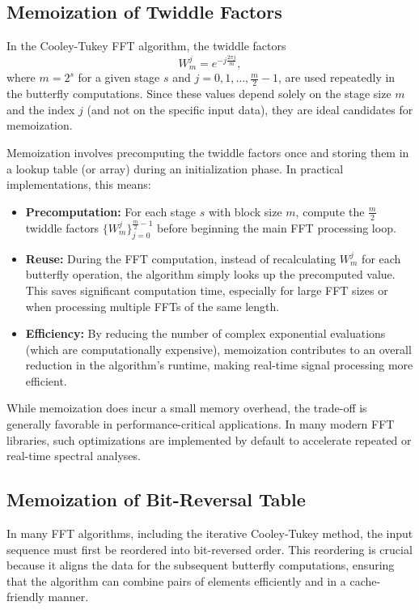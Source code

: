 \documentclass[12pt,letter]{article}
\begin{document}
\subsection{Memoization of Twiddle Factors}

In the Cooley-Tukey FFT algorithm, the twiddle factors
\[
W_m^j = e^{-j\frac{2\pi j}{m}},
\]
where $m = 2^s$ for a given stage $s$ and
$j = 0, 1, \ldots, \frac{m}{2}-1$, are used repeatedly in the butterfly
computations. Since these values depend solely on the stage size $m$ and
the index $j$ (and not on the specific input data), they are ideal
candidates for memoization.

Memoization involves precomputing the twiddle factors once and storing them
in a lookup table (or array) during an initialization phase. In practical
implementations, this means:
\begin{itemize}
  \item \textbf{Precomputation:} For each stage $s$ with block size
  $m$, compute the $\frac{m}{2}$ twiddle factors
  $\{W_m^j\}_{j=0}^{\frac{m}{2}-1}$ before beginning the main FFT
  processing loop.
  \item \textbf{Reuse:} During the FFT computation, instead of recalculating
  $W_m^j$ for each butterfly operation, the algorithm simply looks up the
  precomputed value. This saves significant computation time, especially for
  large FFT sizes or when processing multiple FFTs of the same length.
  \item \textbf{Efficiency:} By reducing the number of complex exponential
  evaluations (which are computationally expensive), memoization contributes
  to an overall reduction in the algorithm's runtime, making real-time signal
  processing more efficient.
\end{itemize}

While memoization does incur a small memory overhead, the trade-off is
generally favorable in performance-critical applications. In many modern FFT
libraries, such optimizations are implemented by default to accelerate
repeated or real-time spectral analyses.

\subsection{Memoization of Bit-Reversal Table}

In many FFT algorithms, including the iterative Cooley-Tukey method, the input
sequence must first be reordered into bit-reversed order. This reordering is
crucial because it aligns the data for the subsequent butterfly computations,
ensuring that the algorithm can combine pairs of elements efficiently and in a
cache-friendly manner.
\end{document}
